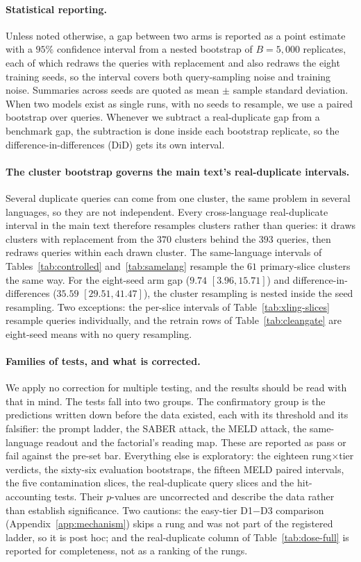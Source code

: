 \paragraph{Statistical reporting.}Unless noted otherwise, a gap between two arms is reported as a point estimate with a $95\%$ confidence interval from a nested bootstrap of $B = 5{,}000$ replicates, each of which redraws the queries with replacement and also redraws the eight training seeds, so the interval covers both query-sampling noise and training noise. Summaries across seeds are quoted as mean $\pm$ sample standard deviation. When two models exist as single runs, with no seeds to resample, we use a paired bootstrap over queries. Whenever we subtract a real-duplicate gap from a benchmark gap, the subtraction is done inside each bootstrap replicate, so the difference-in-differences (DiD) gets its own interval.

\paragraph{The cluster bootstrap governs the main text's real-duplicate intervals.}
Several duplicate queries can come from one cluster, the same problem in several languages, so they are not independent. Every cross-language real-duplicate interval in the main text therefore resamples clusters rather than queries: it draws clusters with replacement from the $370$ clusters behind the $393$ queries, then redraws queries within each drawn cluster. The same-language intervals of Tables~\ref{tab:controlled} and~\ref{tab:samelang} resample the $61$ primary-slice clusters the same way. For the eight-seed arm gap ($9.74$ $[3.96, 15.71]$) and difference-in-differences ($35.59$ $[29.51, 41.47]$), the cluster resampling is nested inside the seed resampling. Two exceptions: the per-slice intervals of Table~\ref{tab:xling-slices} resample queries individually, and the retrain rows of Table~\ref{tab:cleangate} are eight-seed means with no query resampling.

\paragraph{Families of tests, and what is corrected.}
We apply no correction for multiple testing, and the results should be read with that in mind. The tests fall into two groups. The confirmatory group is the predictions written down before the data existed, each with its threshold and its falsifier: the prompt ladder, the SABER attack, the MELD attack, the same-language readout and the factorial's reading map. These are reported as pass or fail against the pre-set bar. Everything else is exploratory: the eighteen rung${\times}$tier verdicts, the sixty-six evaluation bootstraps, the fifteen MELD paired intervals, the five contamination slices, the real-duplicate query slices and the hit-accounting tests. Their $p$-values are uncorrected and describe the data rather than establish significance. Two cautions: the easy-tier D1$-$D3 comparison (Appendix~\ref{app:mechanism}) skips a rung and was not part of the registered ladder, so it is post hoc; and the real-duplicate column of Table~\ref{tab:dose-full} is reported for completeness, not as a ranking of the rungs.

